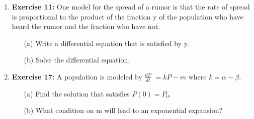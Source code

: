 \documentclass[12pt, a4paper]{article}
\begin{document}
\begin{enumerate}
    \item \textbf{Exercise 11:} One model for the spread of a rumor is that the rate of spread is proportional to the product of the fraction y of the population who have heard the rumor and the fraction who have not.
    \begin{itemize}
        \item[(a)] Write a differential equation that is satisfied by y.
        \item[(b)] Solve the differential equation.
    \end{itemize}
    
    \item \textbf{Exercise 17:} A population is modeled by {\large$\frac{dP}{dt}$} $= kP - m$ where $k = \alpha - \beta$.
    \begin{itemize}
        \item[(a)] Find the solution that satisfies $P(0) = P_0$.
        \item[(b)] What condition on m will lead to an exponential expansion?
    \end{itemize}
\end{enumerate}

\hrulefill
\vspace{1em}
\end{document}
